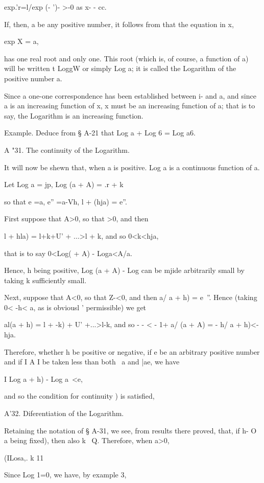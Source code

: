 exp.'r=l/exp (- ')- >-0 as x- - cc.

If, then, a be any positive number, it follows from that the
equation in x,

exp X = a,

has one real root and only one. This root (which is, of course, a
function of a) will be written t LoggW or simply Log a; it is called
the Logarithm of the positive number a.

Since a one-one correspondence has been established between i- and a,
and since a is an increasing function of x, x must be an increasing
function of a; that is to say, the Logarithm is an increasing
function.

Example. Deduce from § A-21 that Log a + Log 6 = Log a6.

A "31. The continuity of the Logarithm.

It will now be shewn that, when a is positive. Log a is a continuous
function of a.

Let Log a = jp, Log (a + A) = .r + k

so that e =a, e'' =a-Vh, l + (hja) = e''.

First suppose that A>0, so that >0, and then

l + hla) = l+k+U' + ...>l + k, and so 0<k<hja,

that is to say 0<Log( + A) - Loga<A/a.

Hence, h being positive, Log (a + A) - Log can be mjide arbitrarily
small by taking k sufficiently small.

Next, suppose that A<0, so that Z-<0, and then a/ a + h) = e~''. Hence
(taking 0< -h< a, as is obviousl ' permissible) we get

al(a + h) = l + -k) + U' +...>l-k, and so - - < - 1+ a/ (a + A) = - h/
a + h)<- hja.

Therefore, whether h be positive or negative, if e be an arbitrary
positive number and if I A I be taken less than both \ a and |ae, we
have

I Log a + h) - Log a\ <e,

and so the condition for continuity ) is satisfied,

A'32. Diferentiation of the Logarithm.

Retaining the notation of § A-31, we see, from results there proved,
 that, if h- O a being fixed), then also k ~Q. Therefore, when a>0,

(ILosa,. k 11

Since Log 1=0, we have, by example 3,

